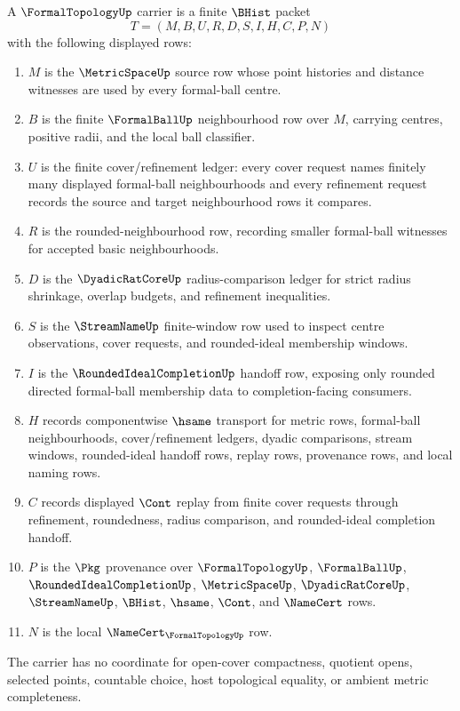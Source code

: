 \begin{definition}
\label{def:formal-topology-carrier}
A $\FormalTopologyUp$ carrier is a finite $\BHist$ packet
$$
T=(M,B,U,R,D,S,I,H,C,P,N)
$$
with the following displayed rows:
\begin{enumerate}
\item $M$ is the $\MetricSpaceUp$ source row whose point histories and distance witnesses are used by every formal-ball centre.
\item $B$ is the finite $\FormalBallUp$ neighbourhood row over $M$, carrying centres, positive radii, and the local ball classifier.
\item $U$ is the finite cover/refinement ledger: every cover request names finitely many displayed formal-ball neighbourhoods and every refinement request records the source and target neighbourhood rows it compares.
\item $R$ is the rounded-neighbourhood row, recording smaller formal-ball witnesses for accepted basic neighbourhoods.
\item $D$ is the $\DyadicRatCoreUp$ radius-comparison ledger for strict radius shrinkage, overlap budgets, and refinement inequalities.
\item $S$ is the $\StreamNameUp$ finite-window row used to inspect centre observations, cover requests, and rounded-ideal membership windows.
\item $I$ is the $\RoundedIdealCompletionUp$ handoff row, exposing only rounded directed formal-ball membership data to completion-facing consumers.
\item $H$ records componentwise $\hsame$ transport for metric rows, formal-ball neighbourhoods, cover/refinement ledgers, dyadic comparisons, stream windows, rounded-ideal handoff rows, replay rows, provenance rows, and local naming rows.
\item $C$ records displayed $\Cont$ replay from finite cover requests through refinement, roundedness, radius comparison, and rounded-ideal completion handoff.
\item $P$ is the $\Pkg$ provenance over $\FormalTopologyUp$, $\FormalBallUp$, $\RoundedIdealCompletionUp$, $\MetricSpaceUp$, $\DyadicRatCoreUp$, $\StreamNameUp$, $\BHist$, $\hsame$, $\Cont$, and $\NameCert$ rows.
\item $N$ is the local $\NameCert_{\FormalTopologyUp}$ row.
\end{enumerate}
The carrier has no coordinate for open-cover compactness, quotient opens, selected points, countable choice, host topological equality, or ambient metric completeness.
\end{definition}

